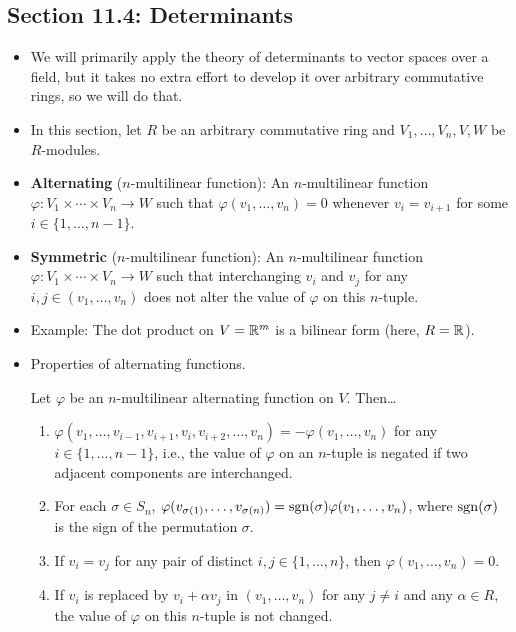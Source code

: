 \documentclass[../notes.tex]{subfiles}
\begin{document}
\subsection*{Section 11.4: Determinants}
\begin{itemize}
    \item {}We will primarily apply the theory of determinants to vector spaces over a field, but it takes no extra effort to develop it over arbitrary commutative rings, so we will do that.
    \item In this section, let $R$ be an arbitrary commutative ring and $V_1,\dots,V_n,V,W$ be $R$-modules.
    \item \textbf{Alternating} ($n$-multilinear function): An $n$-multilinear function $\varphi:V_1\times\cdots\times V_n\to W$ such that $\varphi(v_1,\dots,v_n)=0$ whenever $v_i=v_{i+1}$ for some $i\in\{1,\dots,n-1\}$.
    \item \textbf{Symmetric} ($n$-multilinear function): An $n$-multilinear function $\varphi:V_1\times\cdots\times V_n\to W$ such that interchanging $v_i$ and $v_j$ for any $i,j\in(v_1,\dots,v_n)$ does not alter the value of $\varphi$ on this $n$-tuple.
    \item Example: The dot product on $V=\mathbb{R}^m$ is a bilinear form (here, $R=\mathbb{R}$).
    \item Properties of alternating functions.
    \begin{proposition}\label{prp:11.22}
        Let $\varphi$ be an $n$-multilinear alternating function on $V$. Then\dots
        \begin{enumerate}[ref={\theproposition(\arabic*)}]
            \item \label{prp:11.22.1}$\varphi(v_1,\dots,v_{i-1},v_{i+1},v_i,v_{i+2},\dots,v_n)=-\varphi(v_1,\dots,v_n)$ for any $i\in\{1,\dots,n-1\}$, i.e., the value of $\varphi$ on an $n$-tuple is negated if two adjacent components are interchanged.
            \item \label{prp:11.22.2}For each $\sigma\in S_n$, $\varphi(v_{\sigma(1)},\dots,v_{\sigma(n)})=\operatorname{sgn}(\sigma)\varphi(v_1,\dots,v_n)$, where $\operatorname{sgn}(\sigma)$ is the sign of the permutation $\sigma$.
            \item \label{prp:11.22.3}If $v_i=v_j$ for any pair of distinct $i,j\in\{1,\dots,n\}$, then $\varphi(v_1,\dots,v_n)=0$.
            \item \label{prp:11.22.4}If $v_i$ is replaced by $v_i+\alpha v_j$ in $(v_1,\dots,v_n)$ for any $j\neq i$ and any $\alpha\in R$, the value of $\varphi$ on this $n$-tuple is not changed.

\end{enumerate}
\end{proposition}
\end{itemize}
\end{document}
